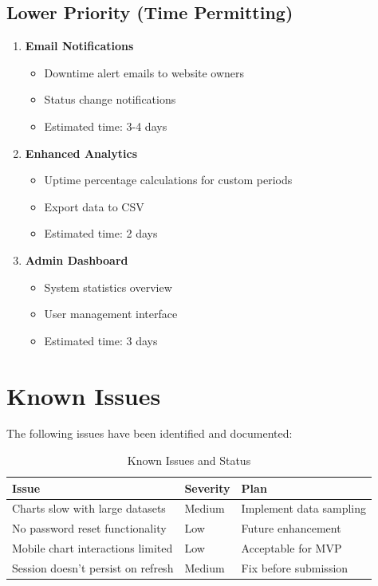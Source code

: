 \subsection{Lower Priority (Time Permitting)}

\begin{enumerate}
    \item \textbf{Email Notifications}
    \begin{itemize}
        \item Downtime alert emails to website owners
        \item Status change notifications
        \item Estimated time: 3-4 days
    \end{itemize}
    
    \item \textbf{Enhanced Analytics}
    \begin{itemize}
        \item Uptime percentage calculations for custom periods
        \item Export data to CSV
        \item Estimated time: 2 days
    \end{itemize}
    
    \item \textbf{Admin Dashboard}
    \begin{itemize}
        \item System statistics overview
        \item User management interface
        \item Estimated time: 3 days
    \end{itemize}
\end{enumerate}

\section{Known Issues}

The following issues have been identified and documented:

\begin{table}[htbp]
    \centering
    \caption{Known Issues and Status}
    \label{tab:known-issues}
    \begin{tabular}{p{6cm}lp{4cm}}
        \toprule
        \textbf{Issue} & \textbf{Severity} & \textbf{Plan} \\
        \midrule
        Charts slow with large datasets & Medium & Implement data sampling \\
        No password reset functionality & Low & Future enhancement \\
        Mobile chart interactions limited & Low & Acceptable for MVP \\
        Session doesn't persist on refresh & Medium & Fix before submission \\
        \bottomrule
    \end{tabular}
\end{table}

